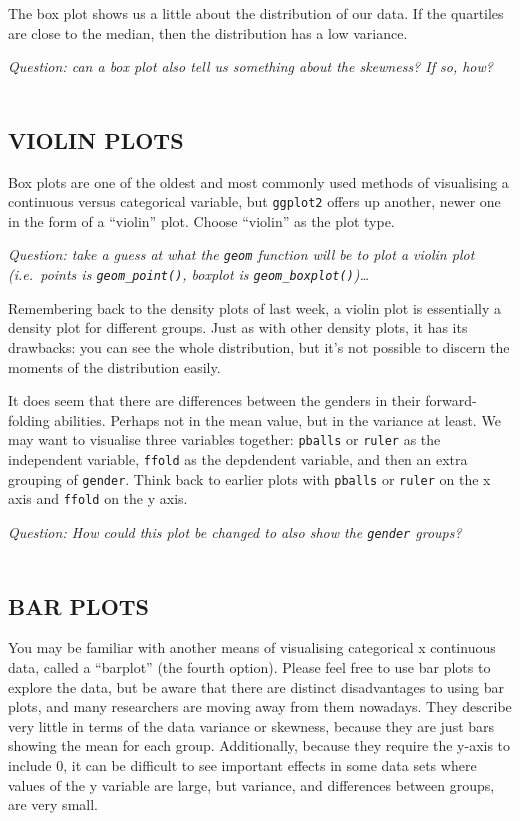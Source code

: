 \documentclass[
]{book}
\begin{document}
The box plot shows us a little about the distribution of our data. If the
quartiles are close to the median, then the distribution has a low variance.

\emph{Question: can a box plot also tell us something about the skewness? If so, how?}\\
~\\

\hypertarget{violin-plots}{%
\subsection{VIOLIN PLOTS}\label{violin-plots}}

Box plots are one of the oldest and most commonly used methods of visualising a
continuous versus categorical variable, but \texttt{ggplot2} offers up another, newer
one in the form of a ``violin'' plot. Choose ``violin'' as the plot type.

\emph{Question: take a guess at what the \texttt{geom} function will be to plot a violin
plot (i.e.~points is \texttt{geom\_point()}, boxplot is \texttt{geom\_boxplot()})\ldots{}}

Remembering back to the density plots of last week, a violin plot is essentially
a density plot for different groups. Just as with other density plots, it has its
drawbacks: you can see the whole distribution, but it's not possible
to discern the moments of the distribution easily.

It does seem that there are differences between the genders in their forward-folding
abilities. Perhaps not in the mean value, but in the variance at least. We may
want to visualise three variables together: \texttt{pballs} or \texttt{ruler} as the independent
variable, \texttt{ffold} as the depdendent variable, and then an extra grouping of
\texttt{gender}. Think back to earlier plots with \texttt{pballs} or \texttt{ruler} on the x axis and
\texttt{ffold} on the y axis.

\emph{Question: How could this plot be changed to also show the \texttt{gender} groups?}\\
~\\

\hypertarget{bar-plots}{%
\subsection{BAR PLOTS}\label{bar-plots}}

You may be familiar with another means of visualising categorical x continuous
data, called a ``barplot'' (the fourth option). Please feel free to use bar plots to
explore the data, but be aware that there are distinct disadvantages to
using bar plots, and many researchers are moving away from them nowadays. They
describe very little in terms of the data variance or skewness, because they are just
bars showing the mean for each group. Additionally, because they require the y-axis to
include 0, it can be difficult to see important effects in some data sets
where values of the y variable are large, but variance, and differences between
groups, are very small.\\
~\\
\end{document}
